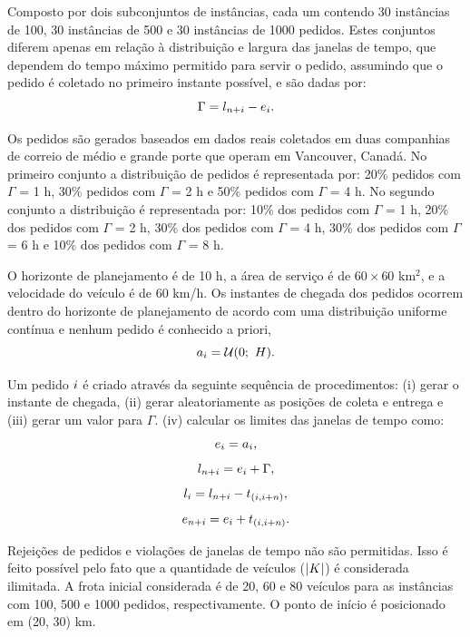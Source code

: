 Composto por dois subconjuntos de instâncias, cada um contendo 30 instâncias de 
100, 30 instâncias de 500 e 30 instâncias de 1000 pedidos.
Estes conjuntos diferem apenas em relação à distribuição e largura das 
janelas de tempo, que dependem do tempo máximo permitido para servir o pedido, 
assumindo que o pedido é coletado no primeiro instante possível, e são dadas 
por:
%
\begin{equation}
    \Gamma = l_{n + i}
              - e_i.
    \label{eq: mitrovic_maximal_time_allowed}
\end{equation}


Os pedidos são gerados baseados em dados reais coletados em duas companhias de 
correio de médio e grande porte que operam em Vancouver, Canadá.
No primeiro conjunto a distribuição de pedidos é representada por: 
20\% pedidos com $\Gamma$ = 1 h, 30\% pedidos com $\Gamma$ = 2 h e 
50\% pedidos com $\Gamma$ = 4 h.
No segundo conjunto a distribuição é representada por: 10\% dos pedidos com 
$\Gamma$ = 1 h, 20\% dos pedidos com $\Gamma$ = 2 h, 30\% dos pedidos com 
$\Gamma$ = 4 h, 30\% dos pedidos com $\Gamma$ = 6 h 
e 10\% dos pedidos com $\Gamma$ = 8 h.

O horizonte de planejamento é de 10 h, a área de serviço é de $60 \times 60$ 
km$^2$, e a velocidade do veículo é de 60 km/h. 
Os instantes de chegada dos pedidos ocorrem dentro do horizonte de planejamento
de acordo com uma distribuição uniforme contínua e nenhum pedido é conhecido 
a priori,
%
\begin{equation}
  a_i = \mathcal{U}(0;\ H).
\end{equation}


Um pedido $i$ é criado através da seguinte sequência de procedimentos: 
(i) gerar o instante de chegada, 
(ii) gerar aleatoriamente as posições de coleta e entrega e 
(iii) gerar um valor para $\Gamma$.
(iv) calcular os limites das janelas de tempo como:
%
\begin{equation}
  e_i = a_i,
\end{equation}
%
\begin{equation}
  l_{n + i} = e_i +
  \Gamma,
\end{equation}
%
\begin{equation}
  l_i = l_{n + i}
  - t_{(i,i+n)},
\end{equation}
%
\begin{equation}
  e_{n + i} = e_i
  + t_{(i,i+n)}.
\end{equation}

Rejeições de pedidos e violações de janelas de tempo não são permitidas. 
Isso é feito possível pelo fato que a quantidade de veículos 
($|K|$) é considerada ilimitada. 
A frota inicial considerada é de 20, 60 e 80 veículos para as instâncias com 
100, 500 e 1000 pedidos, respectivamente. 
O ponto de início é posicionado em (20, 30) km.



